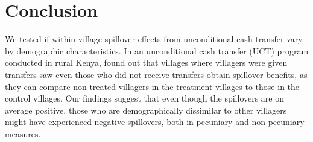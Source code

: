 \documentclass[11pt]{article}
\begin{document}
\section{Conclusion}

    We tested if within-village spillover effects from unconditional cash transfer vary by demographic characteristics. In an unconditional cash transfer (UCT) program conducted in rural Kenya, \textcite{haushofer_short-term_2016} found out that villages where villagers were given transfers saw even those who did not receive transfers obtain spillover benefits, as they can compare non-treated villagers in the treatment villages to those in the control villages. Our findings suggest that even though the spillovers are on average positive, those who are demographically dissimilar to other villagers might have experienced negative spillovers, both in pecuniary and non-pecuniary measures.


\newpage

\printbibliography
\end{document}
